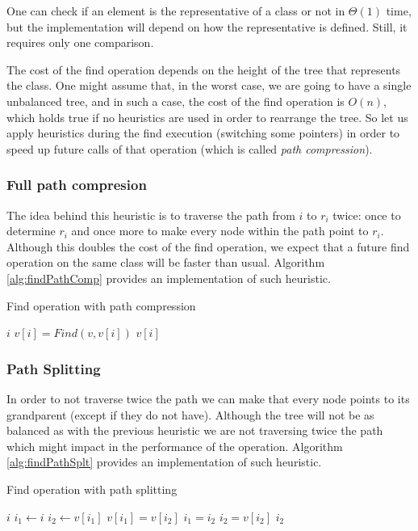 One can check if an element is the representative of a class or not in $\Theta(1)$ time, but the implementation will depend on how the representative is defined. Still, it requires only one comparison.

The cost of the find operation depends on the height of the tree that represents the class. One might assume that, in the worst case, we are going to have a single unbalanced tree, and in such a case, the cost of the find operation is $O(n)$, which holds true if no heuristics are used in order to rearrange the tree. So let us apply heuristics during the find execution (switching some pointers) in order to speed up future calls of that operation (which is called \textit{path compression}). 

\subsubsection{Full path compresion}
The idea behind this heuristic is to traverse the path from \(i\) to \(r_i\) twice: once to determine \(r_i\) and once more to make every node within the path point to \(r_i\). Although this doubles the cost of the find operation, we expect that a future find operation on the same class will be faster than usual. Algorithm \ref{alg:findPathComp} provides an implementation of such heuristic.

\begin{algorithm}
    \caption{Find operation with path compression}\label{alg:findPathComp}
    \begin{algorithmic}
        \State \Return $i$
        \Else
        \State $v[i] = Find(v,v[i])$
        \State \Return $v[i]$
        \EndIf
        \EndFunction
    \end{algorithmic}
\end{algorithm}

\subsubsection{Path Splitting}
In order to not traverse twice the path we can make that every node points to its grandparent (except if they do not have). Although the tree will not be as balanced as with the previous heuristic we are not traversing twice the path which might impact in the performance of the operation. Algorithm \ref{alg:findPathSplt} provides an implementation of such heuristic.


\begin{algorithm}
    \caption{Find operation with path splitting}\label{alg:findPathSplt}
    \begin{algorithmic}
        \State \Return $i$
        \EndIf
        \State $i_1 \gets i$
        \State $i_2 \gets v[i_1]$
        \State $v[i_1] = v[i_2]$
        \State $i_1 = i_2$
        \State $i_2 = v[i_2]$
        \EndWhile
        \State \Return $i_2$
        \EndFunction
    \end{algorithmic}
\end{algorithm}


